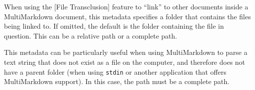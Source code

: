 When using the {[File Transclusion]} feature to ``link'' to other documents inside a MultiMarkdown document, this metadata specifies a folder that contains the files being linked to. If omitted, the default is the folder containing the file in question. This can be a relative path or a complete path.

This metadata can be particularly useful when using MultiMarkdown to parse a text string that does not exist as a file on the computer, and therefore does not have a parent folder (when using \texttt{stdin} or another application that offers MultiMarkdown support). In this case, the path must be a complete path.



